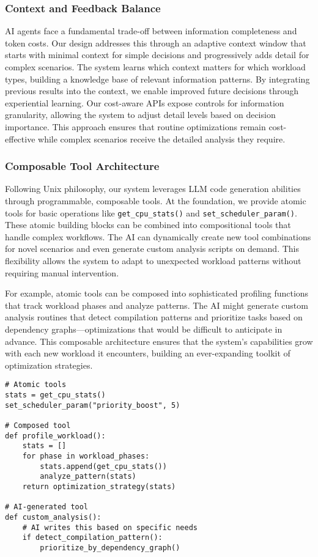 \subsubsection{Context and Feedback Balance}
AI agents face a fundamental trade-off between information completeness and token costs. Our design addresses this through an adaptive context window that starts with minimal context for simple decisions and progressively adds detail for complex scenarios. The system learns which context matters for which workload types, building a knowledge base of relevant information patterns. By integrating previous results into the context, we enable improved future decisions through experiential learning. Our cost-aware APIs expose controls for information granularity, allowing the system to adjust detail levels based on decision importance. This approach ensures that routine optimizations remain cost-effective while complex scenarios receive the detailed analysis they require.

\subsubsection{Composable Tool Architecture}
Following Unix philosophy, our system leverages LLM code generation abilities through programmable, composable tools. At the foundation, we provide atomic tools for basic operations like \texttt{get\_cpu\_stats()} and \texttt{set\_scheduler\_param()}. These atomic building blocks can be combined into compositional tools that handle complex workflows. The AI can dynamically create new tool combinations for novel scenarios and even generate custom analysis scripts on demand. This flexibility allows the system to adapt to unexpected workload patterns without requiring manual intervention.

For example, atomic tools can be composed into sophisticated profiling functions that track workload phases and analyze patterns. The AI might generate custom analysis routines that detect compilation patterns and prioritize tasks based on dependency graphs—optimizations that would be difficult to anticipate in advance. This composable architecture ensures that the system's capabilities grow with each new workload it encounters, building an ever-expanding toolkit of optimization strategies.

\begin{verbatim}
# Atomic tools
stats = get_cpu_stats()
set_scheduler_param("priority_boost", 5)

# Composed tool
def profile_workload():
    stats = []
    for phase in workload_phases:
        stats.append(get_cpu_stats())
        analyze_pattern(stats)
    return optimization_strategy(stats)

# AI-generated tool
def custom_analysis():
    # AI writes this based on specific needs
    if detect_compilation_pattern():
        prioritize_by_dependency_graph()
\end{verbatim}

